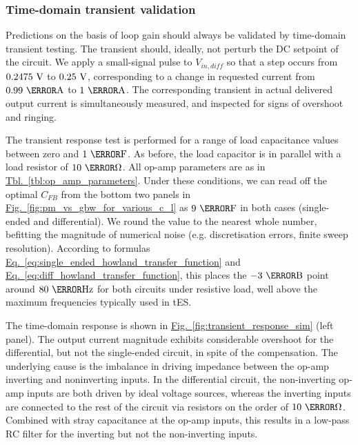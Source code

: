 \documentclass[10pt]{article}
\newcommand{\brieftbllink}[1]{\hyperref[#1]{Tbl.~\ref*{#1}}\xspace }
\newcommand{\briefeqlink}[1]{\hyperref[#1]{Eq.~\ref*{#1}}\xspace }
\newcommand{\brieffiglink}[1]{\hyperref[#1]{Fig.~\ref*{#1}}}
\begin{document}
\subsubsection{Time-domain transient validation}
\label{sec:time_domain_transient_validation}

Predictions on the basis of loop gain should always be validated by time-domain transient testing. The transient should, ideally, not perturb the DC setpoint of the circuit. We apply a small-signal pulse to $V_{in,diff}$ so that a step occurs from $0.2475~\volt$ to $0.25~\volt$, corresponding to a change in requested current from $0.99~\milli\ampere$ to $1~\milli\ampere$. The corresponding transient in actual delivered output current is simultaneously measured, and inspected for signs of overshoot and ringing.

The transient response test is performed for a range of load capacitance values between zero and $1~\micro\farad$. As before, the load capacitor is in parallel with a load resistor of $10~\kilo\ohm$. All op-amp parameters are as in \brieftbllink{tbl:op_amp_parameters}. Under these conditions, we can read off the optimal $C_{FB}$ from the bottom two panels in \brieffiglink{fig:pm_vs_gbw_for_various_c_l} as $9~\pico\farad$ in both cases (single-ended and differential). We round the value to the nearest whole number, befitting the magnitude of numerical noise (e.g. discretisation errors, finite sweep resolution). According to formulas \briefeqlink{eq:single_ended_howland_transfer_function} and \briefeqlink{eq:diff_howland_transfer_function}, this places the $-3~\deci\bel$ point around $80~\kilo\hertz$ for both circuits under resistive load, well above the maximum frequencies typically used in tES.

The time-domain response is shown in \brieffiglink{fig:transient_response_sim} (left panel). The output current magnitude exhibits considerable overshoot for the differential, but not the single-ended circuit, in spite of the compensation. The underlying cause is the imbalance in driving impedance between the op-amp inverting and noninverting inputs. In the differential circuit, the non-inverting op-amp inputs are both driven by ideal voltage sources, whereas the inverting inputs are connected to the rest of the circuit via resistors on the order of $10~\kilo\ohm$. Combined with stray capacitance at the op-amp inputs, this results in a low-pass RC filter for the inverting but not the non-inverting inputs.
\end{document}
